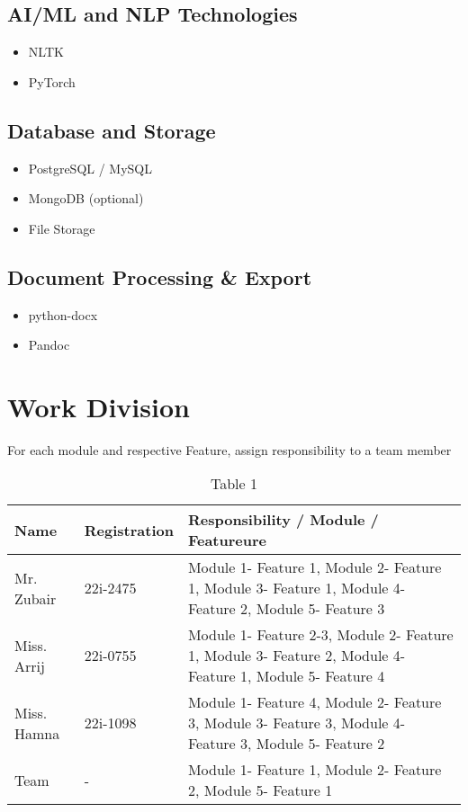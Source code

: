 \subsection*{AI/ML and NLP Technologies}
\begin{itemize}
    \item NLTK 
    \item PyTorch 
\end{itemize}

\subsection*{Database and Storage}
\begin{itemize}
    \item PostgreSQL / MySQL 
    \item MongoDB (optional) 
    \item File Storage 
\end{itemize}

\subsection*{Document Processing \& Export}
\begin{itemize}
    \item python-docx 
    \item Pandoc 
\end{itemize}

\section{Work Division}
For each module and respective Feature, assign responsibility to a team member

\begin{table}[!ht]
\caption{Table 1}
\centering
\small
\begin{tabular}{|p{3cm}|p{2cm}|p{9cm}|}
\hline
\textbf{Name} & \textbf{Registration} & \textbf{Responsibility / Module / Featureure} \\ \hline
Mr. Zubair & 22i-2475 & Module 1- Feature 1, Module 2- Feature 1, Module 3- Feature 1, Module 4- Feature 2, Module 5- Feature 3  \\ \hline  
Miss. Arrij & 22i-0755 & Module 1- Feature 2-3, Module 2- Feature 1, Module 3- Feature 2, Module 4- Feature 1, Module 5- Feature 4  \\ \hline  
Miss. Hamna & 22i-1098 & Module 1- Feature 4, Module 2- Feature 3, Module 3- Feature 3, Module 4- Feature 3, Module 5- Feature 2 \\ \hline
Team & - & Module 1- Feature 1, Module 2- Feature 2, Module 5- Feature 1   \\ \hline  
\end{tabular}
\end{table}

